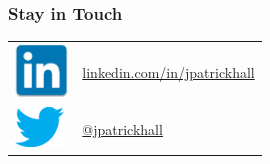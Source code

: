 \documentclass[11pt,
               aspectratio=169
               ]{beamer}
\begin{document}
		\begin{frame}
		
			\frametitle{Stay in Touch}
			
			\begin{tabular}{m{1.5cm} m{8cm}}
				\includegraphics[height=40pt]{img/li.jpg} \newline &  
 				\href{https://www.linkedin.com/in/jpatrickhall}{linkedin.com/in/jpatrickhall} \newline \\
 				\includegraphics[height=30pt]{img/twitter.png} &
 				\href{https://twitter.com/jpatrickhall}{@jpatrickhall}
			\end{tabular}

		\end{frame}
\end{document}
